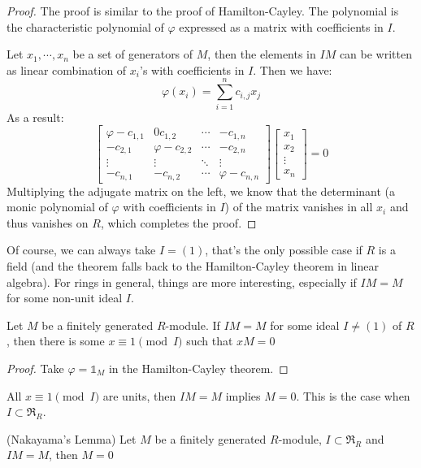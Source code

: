 \documentclass{note-eng}
\begin{document}
\begin{proof}
    The proof is similar to the proof of Hamilton-Cayley. The polynomial is the characteristic polynomial of $\varphi$ expressed as a matrix with coefficients in $I$.

    Let $x_1, \cdots, x_n$ be a set of generators of $M$, then the elements in $IM$ can be written as linear combination of $x_i$'s with coefficients in $I$. Then we have:
    $$\varphi(x_i) = \sum\limits_{i = 1}^{n}c_{i, j} x_j$$
    As a result:
    $$
    \begin{bmatrix}
        \varphi - c_{1, 1} & 0c_{1, 2} & \cdots &-c_{1, n} \\
        - c_{2, 1} & \varphi - c_{2, 2} & \cdots &-c_{2, n} \\
        \vdots &\vdots &\ddots &\vdots \\
        - c_{n, 1} & -c_{n, 2} & \cdots & \varphi - c_{n, n}
    \end{bmatrix}
    \begin{bmatrix}
        x_1 \\ x_2 \\ \vdots \\ x_n
    \end{bmatrix} = 0
    $$
    Multiplying the adjugate matrix on the left, we know that the determinant (a monic polynomial of $\varphi$ with coefficients in $I$) of the matrix vanishes in all $x_i$ and thus vanishes on $R$, which completes the proof.
\end{proof}

Of course, we can always take $I = (1)$, that's the only possible case if $R$ is a field (and the theorem falls back to the Hamilton-Cayley theorem in linear algebra). For rings in general, things are more interesting, especially if $IM = M$ for some non-unit ideal $I$.

\begin{corollary}
    Let $M$ be a finitely generated $R$-module. If $IM = M$ for some ideal $I \ne (1)$ of $R$, then there is some $x \equiv 1 \pmod{I}$ such that $xM = 0$
\end{corollary}

\begin{proof}
    Take $\varphi = \mathds{1}_M$ in the Hamilton-Cayley theorem.
\end{proof}

All $x \equiv 1 \pmod{I}$ are units, then $IM = M$ implies $M = 0$. This is the case when $I \subset \mathfrak{R}_R$.

\begin{theorem}
    (Nakayama's Lemma) Let $M$ be a finitely generated $R$-module, $I \subset \mathfrak{R}_R$ and $IM = M$, then $M = 0$
\end{theorem}
\end{document}
